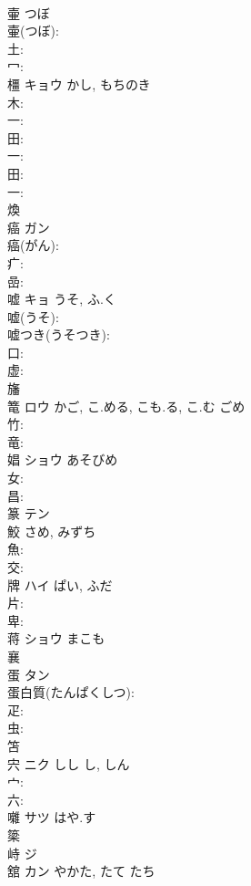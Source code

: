 \documentclass[8pt]{extreport}
\begin{document}
\begin{CJK}{UTF8}{min}
\\	壷		つぼ			
\\	壷(つぼ): 
\\	土: 
\\	冖: 
\\	橿	キョウ	かし, もちのき		
\\	木: 
\\	一: 
\\	田: 
\\	一: 
\\	田: 
\\	一: 
\\	煥						
\\	癌	ガン			
\\	癌(がん): 
\\	疒: 
\\	嵒: 
\\	嘘	キョ	うそ, ふ.く		
\\	嘘(うそ): 
\\	嘘つき(うそつき): 
\\	口: 
\\	虚: 
\\	旛						
\\	篭	ロウ	かご, こ.める, こも.る, こ.む	ごめ	
\\	竹: 
\\	竜: 
\\	娼	ショウ	あそびめ		
\\	女: 
\\	昌: 
\\	篆	テン			
\\	鮫		さめ, みずち			
\\	魚: 
\\	交: 
\\	牌	ハイ	ぱい, ふだ		
\\	片: 
\\	卑: 
\\	蒋	ショウ まこも			
\\	襄						
\\	蛋	タン			
\\	蛋白質(たんぱくしつ): 
\\	疋: 
\\	虫: 
\\	笘						
\\	宍	ニク	しし	し, しん	
\\	宀: 
\\	六: 
\\	囃	サツ はや.す			
\\	簗						
\\	峙	ジ			
\\	舘	カン	やかた, たて	たち	

\end{CJK}
\end{document}
